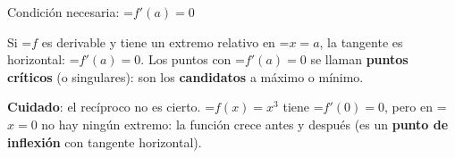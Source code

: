 \documentclass[11pt,a4paper]{article}
\newcommand{\fmm}[1]{\setbox0=\hbox{$#1$}\ifdim\wd0>\linewidth\[#1\]\else\mbox{\box0}\fi}
\newcommand{\fmuline}[1]{\textbf{\color{fmaccent}#1}}
\begin{document}
  
\begin{fmprop}{Condición necesaria: \fmm{f'(a)=0}}
\par\noindent \begin{minipage}[t]{0.48\linewidth}\vspace{0pt}\raggedright Si \fmm{f} es derivable y tiene un extremo relativo en \fmm{x=a}, la tangente es horizontal: \fmm{f'(a)=0}. Los puntos con \fmm{f'(a)=0} se llaman \textbf{puntos críticos} (o singulares): son los \textbf{candidatos} a máximo o mínimo.

          
\begin{fmnote}\fmuline{Cuidado}: el recíproco no es cierto. \fmm{f(x)=x^3} tiene \fmm{f'(0)=0}, pero en \fmm{x=0} no hay ningún extremo: la función crece antes y después (es un \textbf{punto de inflexión} con tangente horizontal).\end{fmnote}\end{minipage}\hfill\begin{minipage}[t]{0.48\linewidth}\vspace{0pt}\raggedright \begin{center}\end{center}\end{minipage}\par\medskip
\end{fmprop}
\end{document}
